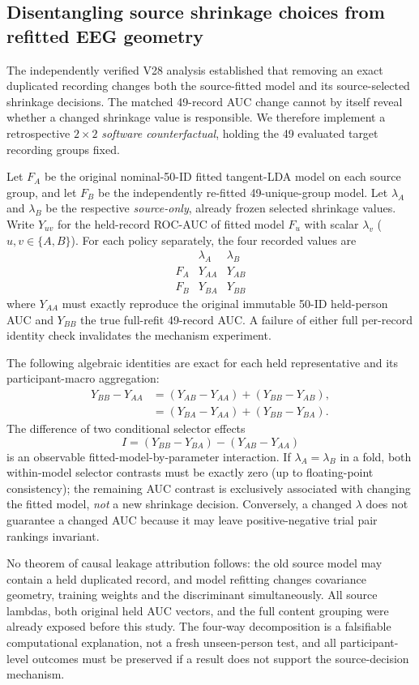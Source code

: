\subsection{Disentangling source shrinkage choices from refitted EEG geometry}
\label{sec:v29-crossed-software-interventions}
The independently verified V28 analysis established that
removing an exact duplicated recording changes both
the source-fitted model and its source-selected shrinkage
decisions. The matched 49-record AUC change cannot by
itself reveal whether a changed shrinkage value is
responsible. We therefore implement a retrospective
$2\times2$ \emph{software counterfactual}, holding
the 49 evaluated target recording groups fixed.

Let $F_A$ be the original nominal-50-ID fitted
tangent-LDA model on each source group, and let
$F_B$ be the independently re-fitted 49-unique-group
model. Let $\lambda_A$ and $\lambda_B$ be the respective
\emph{source-only}, already frozen selected shrinkage
values. Write $Y_{uv}$ for the held-record ROC-AUC
of fitted model $F_u$ with scalar $\lambda_v$
($u,v\in\{A,B\}$). For each policy separately,
the four recorded values are
\[
\begin{array}{c|cc}
 & \lambda_A & \lambda_B\\
\hline
F_A & Y_{AA} & Y_{AB}\\
F_B & Y_{BA} & Y_{BB}
\end{array}
\]
where $Y_{AA}$ must exactly reproduce the
original immutable 50-ID held-person AUC and
$Y_{BB}$ the true full-refit 49-record AUC.
A failure of either full per-record identity
check invalidates the mechanism experiment.

The following algebraic identities are exact
for each held representative and its participant-macro
aggregation:
\begin{align}
Y_{BB}-Y_{AA}
&=(Y_{AB}-Y_{AA})+(Y_{BB}-Y_{AB}),\\
&=(Y_{BA}-Y_{AA})+(Y_{BB}-Y_{BA}).
\end{align}
The difference of two conditional selector effects
\[
 I=(Y_{BB}-Y_{BA})-(Y_{AB}-Y_{AA})
\]
is an observable fitted-model-by-parameter
interaction. If $\lambda_A=\lambda_B$ in a fold,
both within-model selector contrasts must be
exactly zero (up to floating-point consistency);
the remaining AUC contrast is exclusively
associated with changing the fitted model,
\emph{not} a new shrinkage decision. Conversely,
a changed $\lambda$ does not guarantee a changed
AUC because it may leave positive-negative trial
pair rankings invariant.

No theorem of causal leakage attribution follows:
the old source model may contain a held duplicated
record, and model refitting changes covariance
geometry, training weights and the discriminant
simultaneously. All source lambdas, both original
held AUC vectors, and the full content grouping
were already exposed before this study.
The four-way decomposition is a falsifiable
computational explanation, not a fresh
unseen-person test, and all participant-level
outcomes must be preserved if a result does
not support the source-decision mechanism.
